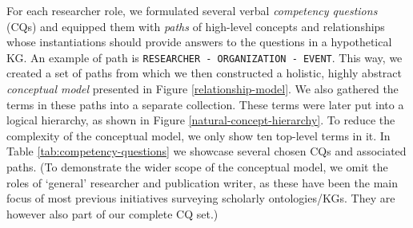 
For each researcher role, we formulated several verbal \emph{competency questions} (CQs) and equipped them with \emph{paths} of high-level concepts and relationships whose instantiations should  provide answers to the questions in a hypothetical KG. An example of path is \texttt{RESEARCHER - ORGANIZATION - EVENT}. This way, we created a set of paths from which we then constructed a holistic, highly abstract \emph{conceptual model} presented in Figure \ref{relationship-model}. We also gathered the terms in these paths into a separate collection. These terms were later put into a logical hierarchy, as shown in Figure \ref{natural-concept-hierarchy}. To reduce the complexity of the conceptual model, we only show ten top-level terms in it.
In Table \ref{tab:competency-questions} we showcase several chosen CQs and associated paths.
(To demonstrate the wider scope of the conceptual model, we omit the roles of `general' researcher and publication writer, as these have been the main focus of most previous initiatives surveying  scholarly ontologies/KGs.
They are however also part of our complete CQ set.)%



